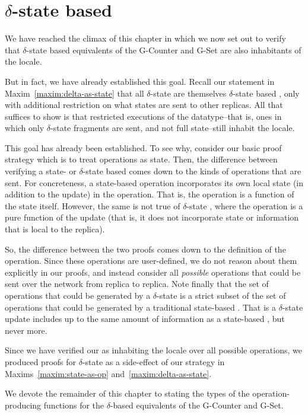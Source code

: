 \section{$\delta$-state based \CRDTs}
We have reached the climax of this chapter in which we now set out to verify
that $\delta$-state based \CRDT equivalents of the G-Counter and G-Set are also
inhabitants of the \SEC locale.

But in fact, we have already established this goal. Recall our statement in
Maxim~\ref{maxim:delta-as-state} that all $\delta$-state \CRDTs are themselves
$\delta$-state based \CRDTs, only with additional restriction on what states are
sent to other replicas. All that suffices to show is that restricted executions
of the datatype--that is, ones in which only $\delta$-state fragments are sent,
and not full state--still inhabit the \SEC locale.

This goal has already been established. To see why, consider our basic proof
strategy which is to treat operations as state. Then, the difference between
verifying a state- or $\delta$-state based \CRDT comes down to the kinds of
operations that are sent. For concreteness, a state-based \CRDT operation
incorporates its own local state (in addition to the update) in the operation.
That is, the operation is a function of the state itself. However, the same is
not true of $\delta$-state \CRDTs, where the operation is a pure function of the
update (that is, it does not incorporate state or information that is local to
the replica).

So, the difference between the two proofs comes down to the definition of the
operation. Since these operations are user-defined, we do not reason about them
explicitly in our proofs, and instead consider all \emph{possible} operations
that could be sent over the network from replica to replica. Note finally that
the set of operations that could be generated by a $\delta$-state \CRDT is a
strict subset of the set of operations that could be generated by a traditional
state-based \CRDT. That is a $\delta$-state \CRDT update includes up to the same
amount of information as a state-based \CRDT, but never more.

Since we have verified our \CRDTs as inhabiting the \SEC locale over all
possible operations, we produced proofs for $\delta$-state \CRDTs as a
side-effect of our strategy in Maxims~\ref{maxim:state-as-op}
and~\ref{maxim:delta-as-state}.

We devote the remainder of this chapter to stating the types of the
operation-producing functions for the $\delta$-based \CRDT equivalents of the
G-Counter and G-Set.

